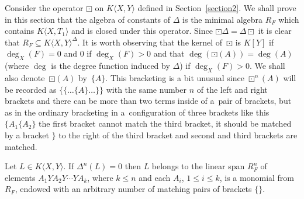 Consider the operator $\boxdot$ on $K\langle X,Y\rangle$ defined in Section~\ref{section2}. We shall prove in this section that the algebra of constants of $\Delta$ is the minimal algebra $R_F$ which contains $K\langle X,T_1\rangle$ and is closed under this operator. Since $\boxdot\Delta = \Delta\boxdot$ it is clear that $R_F \subseteq K\langle X,Y\rangle^{\Delta}$. It is worth observing that the kernel of~$\boxdot$ is $K[Y]$ if $\deg_X(F) = 0$ and $0$ if $\deg_X(F) > 0$ and that $\deg(\boxdot(A)) = \deg(A)$
(where $\deg$ is the degree function induced by $\Delta$) if $\deg_X(F) > 0$. We shall also denote~$\boxdot(A)$ by~$\{A\}$. This bracketing is a bit unusual since
$\boxdot^n(A)$ will be recorded as $\{\{\ldots\{A\}\ldots\}\}$ with the same number $n$ of the left and right brackets and there can be more than two terms inside of a~pair of brackets, but as in the ordinary bracketing in a~configuration of three brackets like this $\{A_1\{A_2\}$ the first bracket cannot match the third bracket, it should be matched by a bracket $\}$ to the right of the third bracket and second and third brackets are matched.

\begin{Theorem}\label{preparing of freedom}Let $L\in K\langle X,Y\rangle$. If $\Delta^n(L) = 0$ then $L$ belongs to the linear span $R_F^n$ of elements $A_1YA_2Y\cdots YA_k$, where $k \leq n$ and each $A_i$, $1 \leq i\leq k$, is a monomial from $R_F$, endowed with an arbitrary number of matching pairs of brackets $\{\}$.
\end{Theorem}

